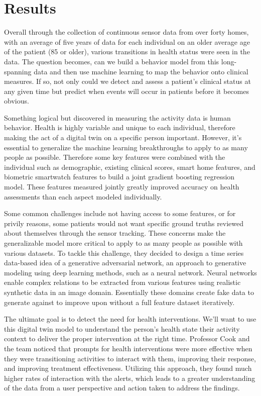 \documentclass[journal,onecolumn]{IEEEtran}
\begin{document}
\section{Results}

Overall through the collection of continuous sensor data from over forty homes, with an average of five years of data for each individual on an older average age of the patient (85 or older), various transitions in health status were seen in the data. The question becomes, can we build a behavior model from this long-spanning data and then use machine learning to map the behavior onto clinical measures. If so, not only could we detect and assess a patient's clinical status at any given time but predict when events will occur in patients before it becomes obvious. 

Something logical but discovered in measuring the activity data is human behavior. Health is highly variable and unique to each individual, therefore making the act of a digital twin on a specific person important. However, it's essential to generalize the machine learning breakthroughs to apply to as many people as possible. Therefore some key features were combined with the individual such as demographic, existing clinical scores, smart home features, and biometric smartwatch features to build a joint gradient boosting regression model. These features measured jointly greatly improved accuracy on health assessments than each aspect modeled individually. 

Some common challenges include not having access to some features, or for privily reasons, some patients would not want specific ground truths reviewed about themselves through the sensor tracking. These concerns make the generalizable model more critical to apply to as many people as possible with various datasets. To tackle this challenge, they decided to design a time series data-based idea of a generative adversarial network, an approach to generative modeling using deep learning methods, such as a neural network. Neural networks enable complex relations to be extracted from various features using realistic synthetic data in an image domain. Essentially these domains create fake data to generate against to improve upon without a full feature dataset iteratively. 

The ultimate goal is to detect the need for health interventions. We'll want to use this digital twin model to understand the person's health state their activity context to deliver the proper intervention at the right time. Professor Cook and the team noticed that prompts for health interventions were more effective when they were transitioning activities to interact with them, improving their response, and improving treatment effectiveness. Utilizing this approach, they found much higher rates of interaction with the alerts, which leads to a greater understanding of the data from a user perspective and action taken to address the findings. 
\end{document}
